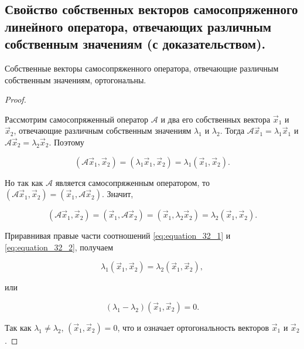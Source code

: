 \subsection{
    Свойство собственных векторов самосопряженного линейного оператора, отвечающих различным собственным значениям (с доказательством).
}

\begin{theorem}
    Собственные векторы самосопряженного оператора, отвечающие различным собственным значениям, ортогональны.
\end{theorem}

\begin{proof}~

    Рассмотрим самосопряженный оператор $\mathscr{A}$ и два его собственных вектора $\vec{x}_1$ и $\vec{x}_2$, отвечающие различным собственным значениям $\lambda_1$ и $\lambda_2$. Тогда $\mathscr{A}\vec{x}_1 = \lambda_1\vec{x}_1$ и $\mathscr{A}\vec{x}_2 = \lambda_2\vec{x}_2$. Поэтому

    \begin{equation}
        (\mathscr{A}\vec{x}_1, \vec{x}_2) = (\lambda_1\vec{x}_1, \vec{x}_2) = \lambda_1(\vec{x}_1, \vec{x}_2).
        \label{eq:equation_32_1}
    \end{equation}

    Но так как $\mathscr{A}$ является самосопряженным оператором, то $(\mathscr{A}\vec{x}_1, \vec{x}_2) = (\vec{x}_1, \mathscr{A}\vec{x}_2)$. Значит,

    \begin{equation}
        (\mathscr{A}\vec{x}_1, \vec{x}_2) = (\vec{x}_1, \mathscr{A}\vec{x}_2) = (\vec{x}_1, \lambda_2\vec{x}_2) = \lambda_2(\vec{x}_1, \vec{x}_2).
        \label{eq:equation_32_2}
    \end{equation}

    Приравнивая правые части соотношений \eqref{eq:equation_32_1} и \eqref{eq:equation_32_2}, получаем

    $$\lambda_1(\vec{x}_1, \vec{x}_2) = \lambda_2(\vec{x}_1, \vec{x}_2),$$

    или

    $$(\lambda_1 - \lambda_2)(\vec{x}_1, \vec{x}_2) = 0.$$

    Так как $\lambda_1 \ne \lambda_2$, $(\vec{x}_1, \vec{x}_2) = 0$, что и означает ортогональность векторов $\vec{x}_1$ и $\vec{x}_2$.
\end{proof}
